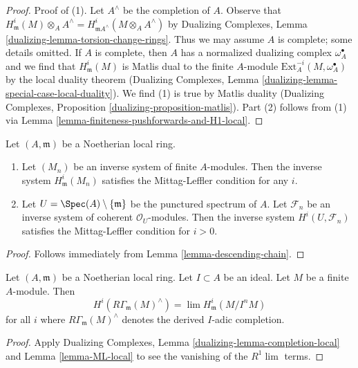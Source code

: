 \begin{proof}
Proof of (1). Let $A^\wedge$ be the completion of $A$. Observe that
$H^i_\mathfrak m(M) \otimes_A A^\wedge =
H^i_{\mathfrak mA^\wedge}(M \otimes_A A^\wedge)$ by
Dualizing Complexes, Lemma \ref{dualizing-lemma-torsion-change-rings}.
Thus we may assume $A$ is complete; some details omitted.
If $A$ is complete, then $A$ has a normalized dualizing complex
$\omega_A^\bullet$ and we find that $H^i_\mathfrak m(M)$ is
Matlis dual to the finite $A$-module $\text{Ext}^{-i}_A(M, \omega_A^\bullet)$
by the local duality theorem (Dualizing Complexes, Lemma
\ref{dualizing-lemma-special-case-local-duality}).
We find (1) is true by Matlis duality
(Dualizing Complexes, Proposition \ref{dualizing-proposition-matlis}).
Part (2) follows from (1) via
Lemma \ref{lemma-finiteness-pushforwards-and-H1-local}.
\end{proof}

\begin{lemma}
\label{lemma-ML-local}
Let $(A, \mathfrak m)$ be a Noetherian local ring.
\begin{enumerate}
\item Let $(M_n)$ be an inverse system of finite $A$-modules. Then the
inverse system $H^i_\mathfrak m(M_n)$ satisfies the Mittag-Leffler
condition for any $i$.
\item Let $U = \Spec(A) \setminus \{\mathfrak m\}$ be the
punctured spectrum of $A$.
Let $\mathcal{F}_n$ be an inverse system of
coherent $\mathcal{O}_U$-modules.
Then the inverse system $H^i(U, \mathcal{F}_n)$
satisfies the Mittag-Leffler condition for $i > 0$.
\end{enumerate}
\end{lemma}

\begin{proof}
Follows immediately from Lemma \ref{lemma-descending-chain}.
\end{proof}

\begin{lemma}
\label{lemma-local-cohomology-derived-completion}
Let $(A, \mathfrak m)$ be a Noetherian local ring.
Let $I \subset A$ be an ideal. Let $M$ be a finite $A$-module.
Then
$$
H^i(R\Gamma_\mathfrak m(M)^\wedge) = \lim H^i_\mathfrak m(M/I^nM)
$$
for all $i$ where $R\Gamma_\mathfrak m(M)^\wedge$ denotes
the derived $I$-adic completion.
\end{lemma}

\begin{proof}
Apply Dualizing Complexes, Lemma \ref{dualizing-lemma-completion-local}
and Lemma \ref{lemma-ML-local} to see the vanishing of the $R^1\lim$ terms.
\end{proof}





